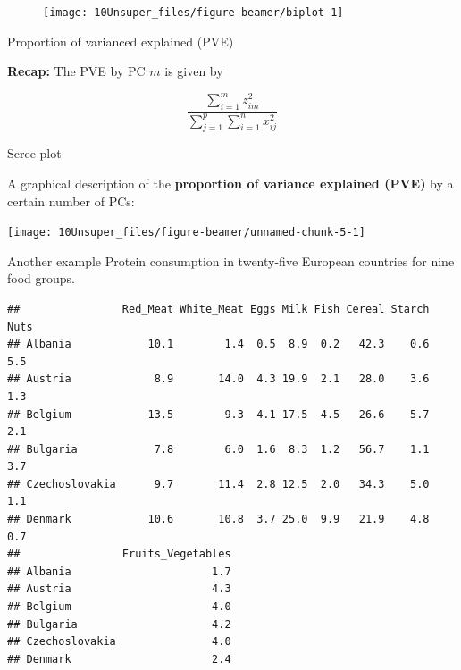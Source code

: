 \documentclass[
  10pt,
  ignorenonframetext,
]{beamer}
\begin{document}
\begin{frame}
\begin{figure}
\texttt{[image: 10Unsuper\_files/figure-beamer/biplot-1]} \end{figure}
\end{frame}

\begin{frame}
\begin{block}{Proportion of varianced explained (PVE)}
\protect\hypertarget{proportion-of-varianced-explained-pve}{}
\(~\)

\textbf{Recap:} The PVE by PC \(m\) is given by

\[
\frac{\sum_{i=1}^m z_{im}^2} {\sum_{j=1}^p\sum_{i=1}^n x_{ij}^2}
\]
\end{block}
\end{frame}

\begin{frame}
\begin{block}{Scree plot}
\protect\hypertarget{scree-plot}{}
\(~\)

A graphical description of the \textbf{proportion of variance explained
(PVE)} by a certain number of PCs:

\centering

\texttt{[image: 10Unsuper\_files/figure-beamer/unnamed-chunk-5-1]}
\end{block}
\end{frame}

\begin{frame}[fragile]{Another example}
\protect\hypertarget{another-example}{}
Protein consumption in twenty-five European countries for nine food
groups.

\begin{verbatim}
##                Red_Meat White_Meat Eggs Milk Fish Cereal Starch Nuts
## Albania            10.1        1.4  0.5  8.9  0.2   42.3    0.6  5.5
## Austria             8.9       14.0  4.3 19.9  2.1   28.0    3.6  1.3
## Belgium            13.5        9.3  4.1 17.5  4.5   26.6    5.7  2.1
## Bulgaria            7.8        6.0  1.6  8.3  1.2   56.7    1.1  3.7
## Czechoslovakia      9.7       11.4  2.8 12.5  2.0   34.3    5.0  1.1
## Denmark            10.6       10.8  3.7 25.0  9.9   21.9    4.8  0.7
##                Fruits_Vegetables
## Albania                      1.7
## Austria                      4.3
## Belgium                      4.0
## Bulgaria                     4.2
## Czechoslovakia               4.0
## Denmark                      2.4
\end{verbatim}
\end{frame}
\end{document}
